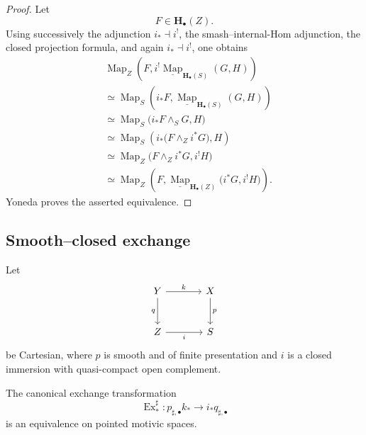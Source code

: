 \begin{proof}
Let
\[
    F
    \in
    \mathbf H_\bullet(Z).
\]
Using successively the adjunction \(i_*\dashv i^!\), the
smash--internal-Hom adjunction, the closed projection formula, and
again \(i_*\dashv i^!\), one obtains
\[
\begin{aligned}
    &
    \operatorname{Map}_Z
    \left(
        F,
        i^!
        \underline{\operatorname{Map}}_{\mathbf H_\bullet(S)}(G,H)
    \right)
    \\
    &\simeq
    \operatorname{Map}_S
    \left(
        i_*F,
        \underline{\operatorname{Map}}_{\mathbf H_\bullet(S)}(G,H)
    \right)
    \\
    &\simeq
    \operatorname{Map}_S
    \bigl(
        i_*F\wedge_SG,
        H
    \bigr)
    \\
    &\simeq
    \operatorname{Map}_S
    \left(
        i_*
        \bigl(
            F\wedge_Zi^*G
        \bigr),
        H
    \right)
    \\
    &\simeq
    \operatorname{Map}_Z
    \bigl(
        F\wedge_Zi^*G,
        i^!H
    \bigr)
    \\
    &\simeq
    \operatorname{Map}_Z
    \left(
        F,
        \underline{\operatorname{Map}}_{\mathbf H_\bullet(Z)}
        \bigl(
            i^*G,
            i^!H
        \bigr)
    \right).
\end{aligned}
\]
Yoneda proves the asserted equivalence.
\end{proof}

\subsection{Smooth--closed exchange}


\begin{theorem}
\label{thm:unstable-smooth-closed-base-change}
Let
\[
\begin{tikzcd}[column sep=large, row sep=large]
    Y
        \arrow[r, "k"]
        \arrow[d, "q"']
    &
    X
        \arrow[d, "p"]
    \\
    Z
        \arrow[r, "i"']
    &
    S
\end{tikzcd}
\]
be Cartesian, where \(p\) is smooth and of finite presentation and
\(i\) is a closed immersion with quasi-compact open complement.

The canonical exchange transformation
\[
    \operatorname{Ex}^{\sharp}_{*}
    \colon
    p_{\sharp,\bullet}k_*
    \longrightarrow
    i_*q_{\sharp,\bullet}
\]
is an equivalence on pointed motivic spaces.
\end{theorem}

